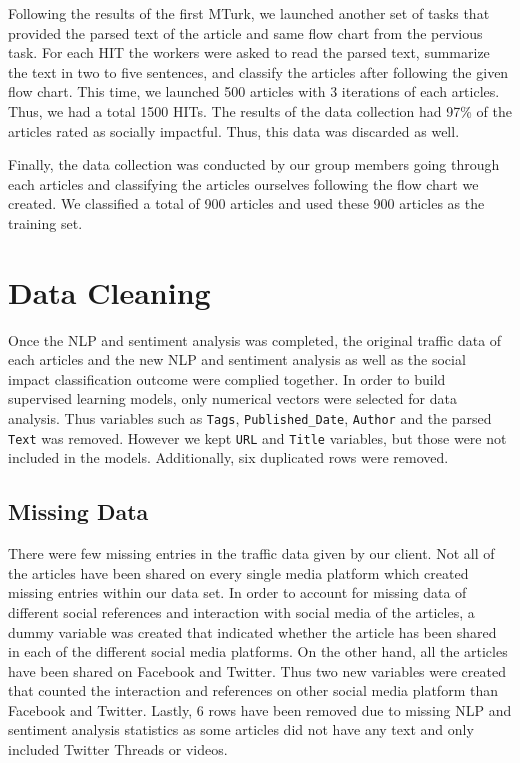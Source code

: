 \documentclass[10pt,letterpaper]{article}
\begin{document}
Following the results of the first MTurk, we launched another set of
tasks that provided the parsed text of the article and same flow chart
from the pervious task. For each HIT the workers were asked to read the
parsed text, summarize the text in two to five sentences, and classify
the articles after following the given flow chart. This time, we
launched 500 articles with 3 iterations of each articles. Thus, we had a
total 1500 HITs. The results of the data collection had 97\% of the
articles rated as socially impactful. Thus, this data was discarded as
well.

Finally, the data collection was conducted by our group members going
through each articles and classifying the articles ourselves following
the flow chart we created. We classified a total of 900 articles and
used these 900 articles as the training set.

\section{Data Cleaning}\label{data-cleaning}

Once the NLP and sentiment analysis was completed, the original traffic
data of each articles and the new NLP and sentiment analysis as well as
the social impact classification outcome were complied together. In
order to build supervised learning models, only numerical vectors were
selected for data analysis. Thus variables such as \texttt{Tags},
\texttt{Published\_Date}, \texttt{Author} and the parsed \texttt{Text}
was removed. However we kept \texttt{URL} and \texttt{Title} variables,
but those were not included in the models. Additionally, six duplicated
rows were removed.

\subsection{Missing Data}\label{missing-data}

There were few missing entries in the traffic data given by our client.
Not all of the articles have been shared on every single media platform
which created missing entries within our data set. In order to account
for missing data of different social references and interaction with
social media of the articles, a dummy variable was created that
indicated whether the article has been shared in each of the different
social media platforms. On the other hand, all the articles have been
shared on Facebook and Twitter. Thus two new variables were created that
counted the interaction and references on other social media platform
than Facebook and Twitter. Lastly, 6 rows have been removed due to
missing NLP and sentiment analysis statistics as some articles did not
have any text and only included Twitter Threads or videos.
\end{document}
